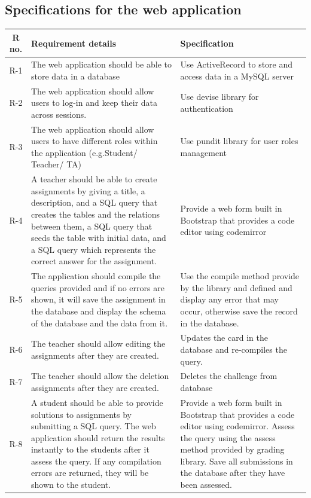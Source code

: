 \subsection{Specifications for the web application}

\begin{tabularx}{\textwidth}{|c|Y|Y|}
  \hline
  \textbf{R no.} & \textbf{Requirement details} & \textbf{Specification} \\\hline
  \endhead
  R-1 & The web application should be able to store data in a database & Use ActiveRecord to store and access data in a MySQL server \\\hline
  R-2 & The web application should allow users to log-in and keep their data across sessions. & Use devise library for authentication \\\hline
  R-3 &  The web application should allow users to have different roles within the application (e.g.Student/ Teacher/ TA) & Use pundit library for user roles management \\\hline
  R-4 &  A teacher should be able to create assignments by giving a title, a description, and a SQL query that creates the tables and the relations between them, a SQL query that seeds the table with initial data, and a SQL query which represents the correct answer for the assignment. & Provide a web form built in Bootstrap that provides a code editor using codemirror \\\hline
  R-5 &  The application should compile the queries provided and if no errors are shown, it will save the assignment in the database and display the schema of the database and the data from it. & Use the compile method provide by the library and defined and display any error that may occur, otherwise save the record in the database. \\\hline
  R-6 & The teacher should allow editing the assignments after they are created. & Updates the card in the database and re-compiles the query. \\\hline
  R-7 & The teacher should allow the deletion assignments after they are created. & Deletes the challenge from database \\\hline
  R-8 & A student should be able to provide solutions to assignments by submitting a SQL query. The web application should return the results instantly to the students after it assess the query. If any compilation errors are returned, they will be shown to the student. & Provide a web form built in Bootstrap that provides a code editor using codemirror. Assess the query using the assess method provided by grading library. Save all submissions in the database after they have been assessed. \\\hline

\end{tabularx}
